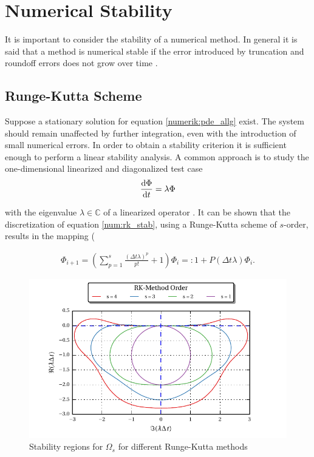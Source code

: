 \section{Numerical Stability}

It is important to consider the stability of a numerical method. In general it is said that a method is numerical stable if the error
introduced by truncation and roundoff errors does not grow over time \citep{ferziger99}.\\

\subsection{Runge-Kutta Scheme}

Suppose  a stationary solution for equation \ref{numerik:pde_allg} exist.
The system should remain unaffected by further integration, even with the introduction of small numerical errors.
In order to obtain a stability criterion it is sufficient enough to perform a linear stability analysis.
A common approach is to study the one-dimensional linearized and diagonalized test case
\begin{align}
\label{num:rk_stab}
\frac{\mathop{}\!\mathrm{d} \Phi}{\mathop{}\!\mathrm{d} t} = \lambda \Phi
\end{align}

with the eigenvalue $\lambda \in \mathbb{C}$ of a linearized operator \citep{Williamson1980}.
It can be shown that the discretization of equation \ref{num:rk_stab}, using a Runge-Kutta scheme of $s$-order,
results in  the mapping (\citep{Williamson1980}

\begin{align}
    \Phi_{i+1}  = \left(\sum_{p=1}^s \frac{(\Delta t \lambda)^p}{p!}  + 1 \right) \Phi_i =: 1 + P(\Delta t\lambda)\Phi_i.
\end{align}

\begin{figure}[!tp]
  \begin{minipage}[c]{0.6\textwidth}
      \includegraphics{gfx/numerik/rk_stability.pdf}
  \end{minipage}\hfill
  \begin{minipage}[c]{0.3\textwidth}
  \caption{Stability regions for $\Omega_s$ for different Runge-Kutta methods}
  \label{fig:num_rkstab}
  \end{minipage}
\end{figure}

